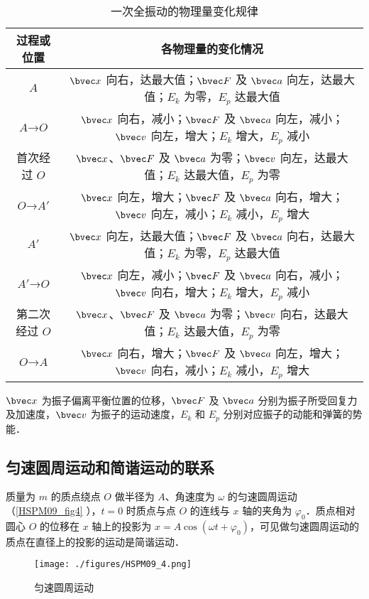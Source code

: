 \begin{table}[ht]
\centering
\caption{一次全振动的物理量变化规律}\label{HSPM09_tab1}
\begin{tabular}{|c|c|}
\hline
过程或位置 & 各物理量的变化情况 \\
\hline
$A$ & $\bvec x$ 向右，达最大值；$\bvec F$ 及 $\bvec a$ 向左，达最大值；$E_k$ 为零，$E_p$ 达最大值 \\
\hline
$A$→$O$ & $\bvec x$ 向右，减小；$\bvec F$ 及 $\bvec a$ 向左，减小；$\bvec v$ 向左，增大；$E_k$ 增大，$E_p$ 减小 \\
\hline
首次经过 $O$ & $\bvec x$、$\bvec F$ 及 $\bvec a$ 为零；$\bvec v$ 向左，达最大值；$E_k$ 达最大值，$E_p$ 为零 \\
\hline
$O$→$A'$ & $\bvec x$ 向左，增大；$\bvec F$ 及 $\bvec a$ 向右，增大；$\bvec v$ 向左，减小；$E_k$ 减小，$E_p$ 增大 \\
\hline
$A'$ & $\bvec x$ 向左，达最大值；$\bvec F$ 及 $\bvec a$ 向右，达最大值；$E_k$ 为零，$E_p$ 达最大值 \\
\hline
$A'$→$O$ & $\bvec x$ 向左，减小；$\bvec F$ 及 $\bvec a$ 向右，减小；$\bvec v$ 向右，增大；$E_k$ 增大，$E_p$ 减小 \\
\hline
第二次经过 $O$ & $\bvec x$、$\bvec F$ 及 $\bvec a$ 为零；$\bvec v$ 向右，达最大值；$E_k$ 达最大值，$E_p$ 为零 \\
\hline
$O$→$A$ & $\bvec x$ 向右，增大；$\bvec F$ 及 $\bvec a$ 向左，增大；$\bvec v$ 向右，减小；$E_k$ 减小，$E_p$ 增大 \\
\hline
\end{tabular}
\end{table}
$\bvec x$ 为振子偏离平衡位置的位移，$\bvec F$ 及 $\bvec a$ 分别为振子所受回复力及加速度，$\bvec v$ 为振子的运动速度，$E_k$ 和 $E_p$ 分别对应振子的动能和弹簧的势能．

\subsection{匀速圆周运动和简谐运动的联系}

质量为 $m$ 的质点绕点 $O$ 做半径为 $A$、角速度为 $\omega$ 的匀速圆周运动（\autoref{HSPM09_fig4} ），$t=0$ 时质点与点 $O$ 的连线与 $x$ 轴的夹角为 $\varphi_0$．质点相对圆心 $O$ 的位移在 $x$ 轴上的投影为 $x=A\cos(\omega t + \varphi_0)$，可见做匀速圆周运动的质点在直径上的投影的运动是简谐运动．

\begin{figure}[ht]
\centering
\texttt{[image: ./figures/HSPM09\_4.png]}
\caption{匀速圆周运动} \label{HSPM09_fig4}
\end{figure}

